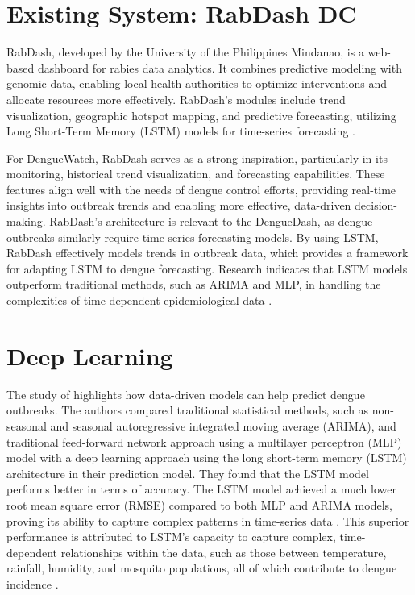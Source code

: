 \section{Existing System: RabDash DC}
%
%
RabDash, developed by the University of the Philippines Mindanao, is a web-based dashboard for rabies data analytics. It combines predictive modeling with genomic data, enabling local health authorities to optimize interventions and allocate resources more effectively. RabDash's modules include trend visualization, geographic hotspot mapping, and predictive forecasting, utilizing Long Short-Term Memory (LSTM) models for time-series forecasting \cite{rabdash}.

For DengueWatch, RabDash serves as a strong inspiration, particularly in its monitoring, historical trend visualization, and forecasting capabilities. These features align well with the needs of dengue control efforts, providing real-time insights into outbreak trends and enabling more effective, data-driven decision-making. RabDash’s architecture is relevant to the DengueDash, as dengue outbreaks similarly require time-series forecasting models. By using LSTM, RabDash effectively models trends in outbreak data, which provides a framework for adapting LSTM to dengue forecasting. Research indicates that LSTM models outperform traditional methods, such as ARIMA and MLP, in handling the complexities of time-dependent epidemiological data \cite{ligue2022deep}.


\section{Deep Learning}
The study of \cite{ligue2022deep} highlights how data-driven models can help predict dengue outbreaks. The authors compared traditional statistical methods, such as non-seasonal and seasonal autoregressive integrated moving average (ARIMA), and traditional feed-forward network approach using a multilayer perceptron (MLP) model with a deep learning approach using the long short-term memory (LSTM) architecture in their prediction model. They found that the LSTM model performs better in terms of accuracy. The LSTM model achieved a much lower root mean square error (RMSE) compared to both MLP and ARIMA models, proving its ability to capture complex patterns in time-series data \cite{ligue2022deep}. This superior performance is attributed to LSTM’s capacity to capture complex, time-dependent relationships within the data, such as those between temperature, rainfall, humidity, and mosquito populations, all of which contribute to dengue incidence \cite{ligue2022deep}.

